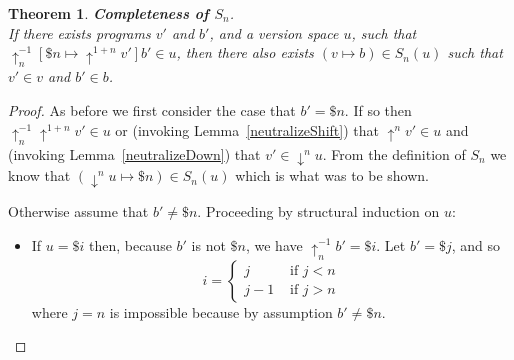 \documentclass{article}
\newcommand{\shift}[1]{\uparrow^{#1}}
\newcommand{\downshift}[1]{\downarrow^{#1}}
\newtheorem{theorem}{Theorem}
\begin{document}
\begin{theorem}
  \textbf{Completeness of $S_n$}.\\
  If there exists programs $v'$  and $b'$, and a version space $u$, such that $\shift{-1}_n[\$n\mapsto \shift{1 + n}v']b'\in u$,
  then there also exists $(v\mapsto b)\in S_n(u)$ such that $v'\in v$ and $b'\in b$.
\end{theorem}
\begin{proof}
  As before we first consider the case that $b' = \$n$.
  If so then
  $\shift{-1}_n\shift{1 + n}v'\in u$ or (invoking Lemma~\ref{neutralizeShift}) that $\shift{n}v'\in u$
  and (invoking Lemma~\ref{neutralizeDown}) that $v'\in \downshift{n}u$.
  From the definition of $S_n$ we know that $(\downshift{n}u\mapsto \$n)\in S_n(u)$ which is what was to be shown.

  Otherwise assume that $b'\not=\$n$. Proceeding by structural induction on $u$:
  \begin{itemize}
  \item If $u = \$i$ then,
    because $b'$ is not $\$n$,
    we have $\shift{-1}_nb' = \$i$.
    Let $b' = \$j$,
    and so
    $$
    i =
    \begin{cases}
      j&\text{ if }j < n\\
      j - 1&\text{ if }j > n
    \end{cases}
    $$
    where $j = n$ is impossible because by assumption $b'\not=\$n$.
    

\end{itemize}
\end{proof}
\end{document}
